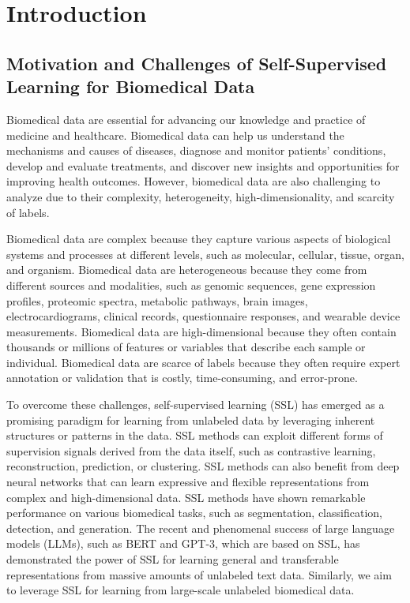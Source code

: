 \chapter{Introduction}
\label{Introduction}

\section{Motivation and Challenges of Self-Supervised Learning for Biomedical Data}

Biomedical data are essential for advancing our knowledge and practice of medicine and healthcare. Biomedical data can help us understand the mechanisms and causes of diseases, diagnose and monitor patients' conditions, develop and evaluate treatments, and discover new insights and opportunities for improving health outcomes. However, biomedical data are also challenging to analyze due to their complexity, heterogeneity, high-dimensionality, and scarcity of labels.

Biomedical data are complex because they capture various aspects of biological systems and processes at different levels, such as molecular, cellular, tissue, organ, and organism. Biomedical data are heterogeneous because they come from different sources and modalities, such as genomic sequences, gene expression profiles, proteomic spectra, metabolic pathways, brain images, electrocardiograms, clinical records, questionnaire responses, and wearable device measurements. Biomedical data are high-dimensional because they often contain thousands or millions of features or variables that describe each sample or individual. Biomedical data are scarce of labels because they often require expert annotation or validation that is costly, time-consuming, and error-prone.

To overcome these challenges, self-supervised learning (SSL) has emerged as a promising paradigm for learning from unlabeled data by leveraging inherent structures or patterns in the data. SSL methods can exploit different forms of supervision signals derived from the data itself, such as contrastive learning, reconstruction, prediction, or clustering. SSL methods can also benefit from deep neural networks that can learn expressive and flexible representations from complex and high-dimensional data. SSL methods have shown remarkable performance on various biomedical tasks, such as segmentation\cite{krishnan2022self}, classification\cite{serra2019multiview}, detection\cite{wang2023multitask}, and generation. The recent and phenomenal success of large language models (LLMs), such as BERT\cite{devlin2018bert} and GPT-3\cite{brown2020language}, which are based on SSL, has demonstrated the power of SSL for learning general and transferable representations from massive amounts of unlabeled text data. Similarly, we aim to leverage SSL for learning from large-scale unlabeled biomedical data.

